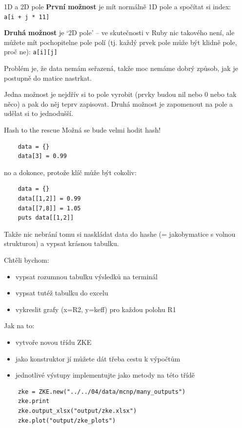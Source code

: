 \documentclass{beamer}
\begin{document}
\begin{frame}[fragile]{1D a 2D pole}
  \textbf{První možnost} je mít normálně 1D pole a spočítat si index:\\
  \texttt{a[i + j * 11]}
  \pause


  \textbf{Druhá možnost} je `2D pole' -- ve skutečnosti v Ruby nic takového není, ale můžete mít pochopitelne pole polí (tj. každý prvek pole může být klidně pole, proč ne):
  \texttt{a[i][j]}
  \pause

  Problém je, že data nemám seřazená, takže moc nemáme dobrý způsob, jak je postupně do matice nastrkat.

  Jedna možnost je nejdřív si to pole vyrobit (prvky budou nil nebo 0 nebo tak něco) a pak do něj teprv zapisovat.
  Druhá možnost je zapomenout na pole a udělat si to jednodušší.
\end{frame}

\begin{frame}[fragile]{Hash to the rescue}
  Možná se bude velmi hodit hash!
  {\scriptsize
  \begin{verbatim}
    data = {}
    data[3] = 0.99
  \end{verbatim}
  }
  \pause
  no a dokonce, protože klíč může být cokoliv:
  {\scriptsize
  \begin{verbatim}
    data = {}
    data[[1,2]] = 0.99
    data[[7,8]] = 1.05
    puts data[[1,2]]
  \end{verbatim}
  }
  Takže nic nebrání tomu si naskládat data do hashe (= jakobymatice s volnou strukturou) a vypsat krásnou tabulku.
\end{frame}


\begin{frame}
  Chtěli bychom:
  \begin{itemize}
    \item vypsat rozumnou tabulku výsledků na terminál
    \item vypsat tutéž tabulku do excelu
    \item vykreslit grafy (x=R2, y=keff) pro každou polohu R1   
  \end{itemize}
\end{frame}

\begin{frame}[fragile]
  Jak na to:
  \begin{itemize}
    \item vytvoře novou třídu ZKE
    \item jako konstruktor jí můžete dát třeba cestu k výpočtům
    \item jednotlivé výstupy implementujte jako metody na této třídě  
  \end{itemize}
  \begin{verbatim}
    zke = ZKE.new("../../04/data/mcnp/many_outputs")
    zke.print
    zke.output_xlsx("output/zke.xlsx")
    zke.plot("output/zke_plots")
  \end{verbatim}
\end{frame}
\end{document}
